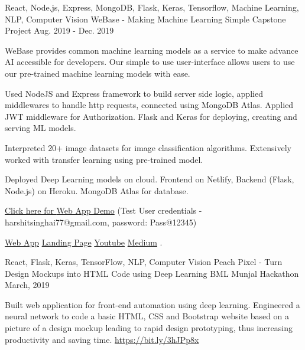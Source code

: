 \begin{cventries}
  \cventry
    {React, Node.js, Express, MongoDB, Flask, Keras, Tensorflow, Machine Learning, NLP, Computer Vision} %
    {WeBase - Making Machine Learning Simple} %
    {Capstone Project} %
    {Aug. 2019 - Dec. 2019} %
    {
      \begin{cvitems} %
        \item {WeBase provides common machine learning models as a service to make advance AI accessible for developers. Our simple to use user-interface allows users to use our pre-trained machine learning models with ease.}
        \item {Used NodeJS and Express framework to build server side logic, applied middlewares to handle http requests, connected using MongoDB Atlas. Applied JWT middleware for Authorization. Flask and Keras for deploying, creating and serving ML models.}
        \item {Interpreted 20+ image datasets for image classification algorithms. Extensively worked with transfer learning using pre-trained model.}
        \item {Deployed Deep Learning models on cloud. Frontend on Netlify, Backend (Flask, Node.js) on Heroku. MongoDB Atlas for database. }
        \item {
        \href{https://app-webase.netlify.app/}{Click here for \textcolor{mypink}{Web App Demo}}
        (Test User credentials - harshitsinghai77@gmail.com, password: Pass@12345)
        }
        \item {
        \href{https://app-webase.netlify.app/}{\textcolor{mypink}{Web App}}
        \href{https://webaseai.netlify.app/}{\textcolor{mypink}{Landing Page}}
        \href{https://www.youtube.com/watch?v=buU5tFiB_qQ}{\textcolor{mypink}{Youtube}} \href{https://medium.com/@harshitsinghai77/introducing-webase-3f765076c403}{\textcolor{mypink}{Medium}}
        }. 
      \end{cvitems}
    }


\cventry
    {React, Flask, Keras, TensorFlow, NLP, Computer Vision} %
    {Peach Pixel - Turn Design Mockups into HTML Code using Deep Learning} %
    {BML Munjal Hackathon } %
    {March, 2019} %
    {
      \begin{cvitems} %
      \item Built web application for front-end automation using deep learning. Engineered a neural network to code a basic HTML, CSS and Bootstrap website based on a picture of a design mockup leading to rapid design prototyping, thus increasing productivity and saving time. \href{https://bit.ly/3hJPp8x}{\textcolor{mypink}{https://bit.ly/3hJPp8x}} 
      \end{cvitems}
    }
    
\end{cventries}
